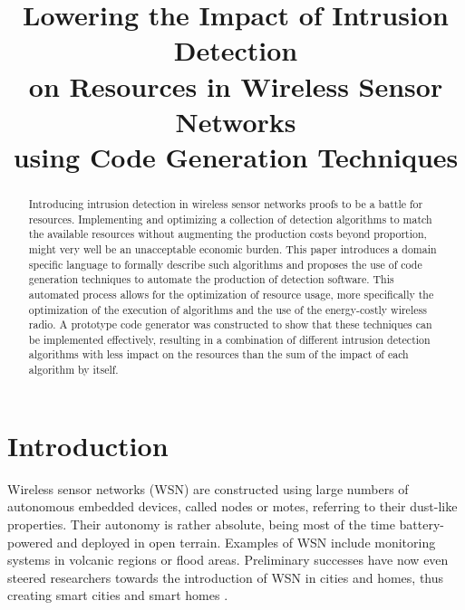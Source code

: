 \documentclass[conference]{IEEEtran}
\begin{document}
\title{Lowering the Impact of Intrusion Detection\\
on Resources in Wireless Sensor Networks\\
using Code Generation Techniques}

\author{%
}

\maketitle

\begin{abstract}
  
Introducing intrusion detection in wireless sensor networks proofs to be a
battle for resources. Implementing and optimizing a collection of detection
algorithms to match the available resources without augmenting the production
costs beyond proportion, might very well be an unacceptable economic burden.
This paper introduces a domain specific language to formally describe such
algorithms and proposes the use of code generation techniques to automate the
production of detection software. This automated process allows for the
optimization of resource usage, more specifically the optimization of the
execution of algorithms and the use of the energy-costly wireless radio. A
prototype code generator was constructed to show that these techniques can be
implemented effectively, resulting in a combination of different intrusion
detection algorithms with less impact on the resources than the sum of the
impact of each algorithm by itself.

\end{abstract}

\section{Introduction}

Wireless sensor networks (WSN) are constructed using large numbers of
autonomous embedded devices, called nodes or motes, referring to their
dust-like properties. Their autonomy is rather absolute, being most of the time
battery-powered and deployed in open terrain. Examples of WSN include
monitoring systems in volcanic regions or flood areas. Preliminary successes
have now even steered researchers towards the introduction of WSN in cities and
homes, thus creating smart cities \cite{schaffers2011smart} and smart homes
\cite{chan2008review}.
\end{document}
